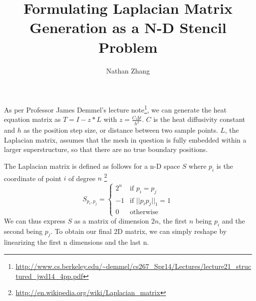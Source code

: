 \documentclass[11pt, oneside]{article}   	%
\title{Formulating Laplacian Matrix Generation as a N-D Stencil Problem}
\author{Nathan Zhang}
\begin{document}
\maketitle
As per Professor James Demmel's lecture note\footnote{\url{http://www.cs.berkeley.edu/~demmel/cs267_Spr14/Lectures/lecture21_structured_jwd14_4pp.pdf}}, we can generate the heat equation matrix as $T = I - z*L$ with $z = \frac{C \Delta t}{h^2}$. $C$ is the heat diffusivity constant and $h$ as the position step size, or distance between two sample points.  $L$, the Laplacian matrix, assumes that the mesh in question is fully embedded within a larger superstructure, so that there are no true boundary positions. 

The Laplacian matrix is defined as follows for a n-D space $S$ where $p_i$ is the coordinate of point $i$ of degree $n$ \footnote{\url{http://en.wikipedia.org/wiki/Laplacian_matrix}}\\
\[
S_{p_i, p_j} =
  \begin{cases}
  	2^n & \text{if } p_i = p_j\\
	-1 & \text{if } ||p_ip_j||_1 = 1\\
	0 & \text{otherwise}
  \end{cases}
\]
We can thus express $S$ as a matrix of dimension $2n$, the first $n$ being $p_i$ and the second being $p_j$. To obtain our final 2D matrix, we can simply reshape by linearizing the first n dimensions and the last n.
\end{document}
